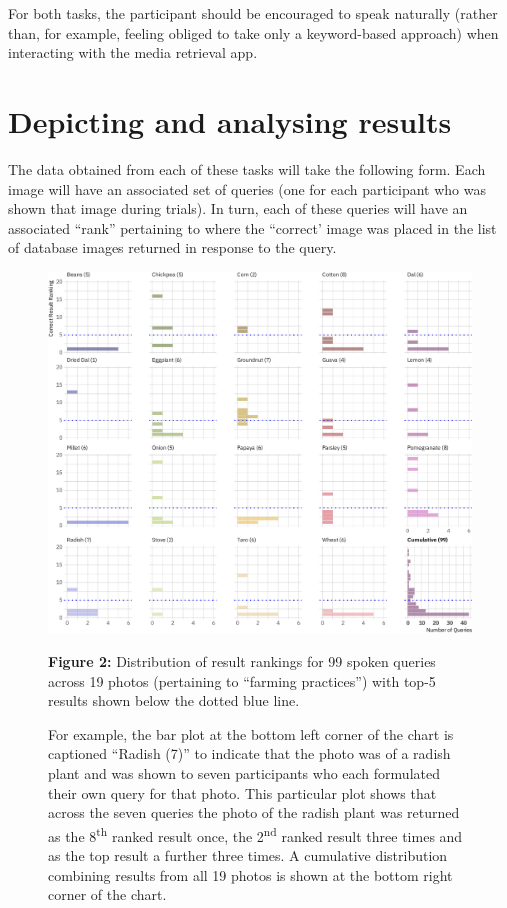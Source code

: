 \documentclass[10pt,twoside,openright]{report}
\begin{document}
For both tasks, the participant should be encouraged to speak naturally (rather than, for example, feeling obliged to take only a keyword-based approach) when interacting with the media retrieval app.


\section{Depicting and analysing results}
The data obtained from each of these tasks will take the following form.
Each image will have an associated set of queries (one for each participant who was shown that image during trials).
In turn, each of these queries will have an associated ``rank'' pertaining to where the ``correct' image was placed in the list of database images returned in response to the query.


\begin{figure}\centering
    \includegraphics[width=\textwidth]{media/results}
    \caption{\textbf{Figure 2: }
    Distribution of result rankings for 99 spoken queries across 19 photos (pertaining to ``farming practices'') with top-5 results shown below the dotted blue line.}
    \caption{For example, the bar plot at the bottom left corner of the chart is captioned ``Radish (7)'' to indicate that the photo was of a radish plant and was shown to seven participants who each formulated their own query for that photo.
    This particular plot shows that across the seven queries the photo of the radish plant was returned as the 8\textsuperscript{th} ranked result once, the 2\textsuperscript{nd} ranked result three times and as the top result a further three times.
    A cumulative distribution combining results from all 19 photos is shown at the bottom right corner of the chart.
    \label{Fig-photo-rankings}\vspace{10em}}
\end{figure}
\end{document}
